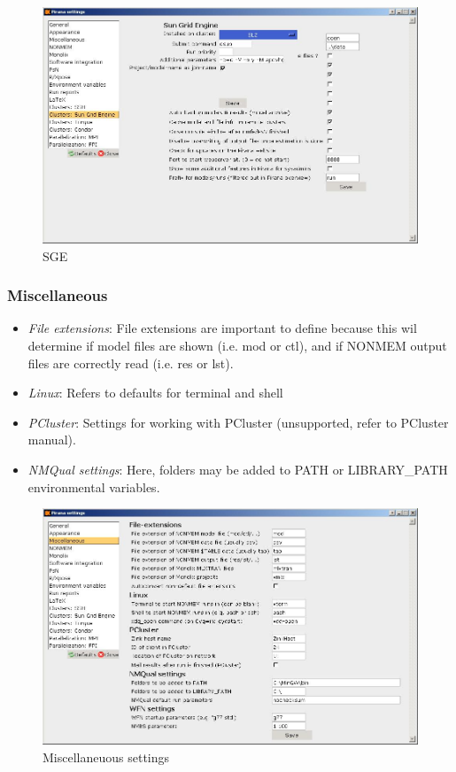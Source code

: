 \begin{figure}[h] \centering
    \includegraphics[scale=.4]{images/settings_5.jpg}
    \caption{SGE}
\end{figure}

\subsubsection*{Miscellaneous}
\begin{itemize}
\item \emph{File extensions}: File extensions are important to define because this wil determine if model files are shown (i.e. mod or ctl), and if NONMEM output files are correctly read (i.e. res or lst). 
\item \emph{Linux}: Refers to defaults for terminal and shell
\item \emph{PCluster}: Settings for working with PCluster (unsupported, refer to PCluster manual).
\item \emph{NMQual settings}: Here, folders may be added to PATH or LIBRARY\_PATH environmental variables.
\end{itemize}

\begin{figure}[h] \centering
    \includegraphics[scale=.4]{images/settings_6.jpg}
    \caption{Miscellaneuous settings}
\end{figure}